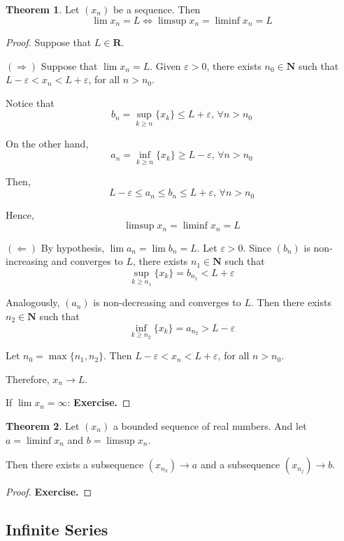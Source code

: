 \documentclass[12pt,a4paper]{article}
\theoremstyle{definition}
\newtheorem{theorem}{Theorem}[section]
\begin{document}
\begin{theorem}
	Let $(x_n)$ be a sequence. Then
	\[
		\lim x_n = L \iff \limsup x_n = \liminf x_n = L
	\]
\end{theorem}

\begin{proof}
	Suppose that $L \in \textbf{R}$.
	
	$(\Rightarrow)$ Suppose that $\lim x_n = L$. Given $\varepsilon > 0$, there exists $n_0 \in \textbf{N}$ such that $L - \varepsilon < x_n < L + \varepsilon$, for all $n > n_0$.
	
	Notice that
	\[
		b_n = \sup_{k \geq n} \{ x_k \} \leq L + \varepsilon, \, \forall n > n_0
	\]
	
	On the other hand,
	\[
		a_n = \inf_{k \geq n} \{ x_k \} \geq L - \varepsilon, \, \forall n > n_0
	\]
	
	Then,
	\[
		L - \varepsilon \leq a_n \leq b_n \leq L + \varepsilon, \, \forall n > n_0
	\]
	
	Hence,
	\[
		\limsup x_n = \liminf x_n = L
	\]
	
	$(\Leftarrow)$ By hypothesis, $\lim a_n = \lim b_n = L$. Let $\varepsilon > 0$. Since $(b_n)$ is non-increasing and converges to $L$, there exists $n_1 \in \textbf{N}$ such that
	\[
		\sup_{k \geq n_1} \{ x_k \} = b_{n_1} < L + \varepsilon
	\]
	
	Analogously, $(a_n)$ is non-decreasing and converges to $L$. Then there exists $n_2 \in \textbf{N}$ such that  
	\[
		\inf_{k \geq n_2} \{ x_k \} = a_{n_2} > L - \varepsilon
	\]
	
	Let $n_0 = \max \{n_1, n_2 \}$. Then $L - \varepsilon < x_n < L + \varepsilon$, for all $n > n_0$.
	
	Therefore, $x_n \longrightarrow L$.
	
	If $\lim x_n = \infty$: \textbf{Exercise.}
\end{proof}

\begin{theorem}
	Let $(x_n)$ a bounded sequence of real numbers. And let $a = \liminf x_n$ and $b = \limsup x_n$.
	
	Then there exists a subsequence $(x_{n_k}) \longrightarrow a$ and a subsequence $(x_{n_j}) \longrightarrow b$.
\end{theorem}

\begin{proof}
	\textbf{Exercise.}
\end{proof}

\subsection{Infinite Series}
\end{document}
